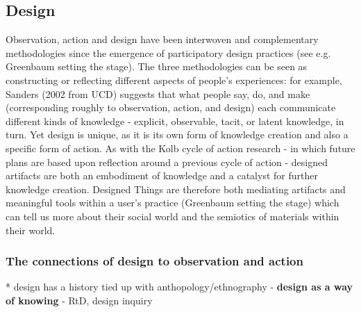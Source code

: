 \subsection{Design}
\label{3-design}

Observation, action and design have been interwoven and complementary methodologies since the emergence of participatory design practices (see e.g. Greenbaum setting the stage). The three methodologies can be seen as constructing or reflecting different aspects of people's experiences: for example, Sanders (2002 from UCD) suggests that what people say, do, and make (corresponding roughly to observation, action, and design) each communicate different kinds of knowledge  - explicit, observable, tacit, or latent knowledge, in turn. Yet design is unique, as it is its own form of knowledge creation and also a specific form of action. As with the Kolb cycle of action research - in which future plans are based upon reflection around a previous cycle of action - designed artifacts are both an embodiment of knowledge and a catalyst for further knowledge creation. Designed Things are therefore both mediating artifacts and meaningful tools within a user's practice (Greenbaum setting the stage) which can tell us more about their social world and the semiotics of materials within their world. 

\subsubsection{The connections of design to observation and action}

* design has a history tied up with anthopology/ethnography -\textbf{ design as a way of knowing }- RtD, design inquiry

